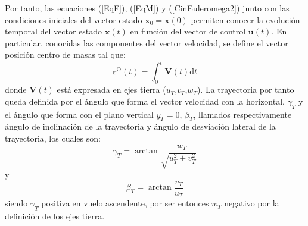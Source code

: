 Por tanto, las ecuaciones (\ref{EqF}), (\ref{EqM}) y (\ref{CinEuleromega2}) junto con las condiciones iniciales del vector estado $\mathrm{\textbf{x}_0}=\mathrm{\textbf{x}(0)}$ permiten conocer la evolución temporal del vector estado $\mathrm{\textbf{x}}(t)$ en función del vector de control $\mathrm{\textbf{u}}(t)$. En particular, conocidas las componentes del vector velocidad, se define el vector posición centro de masas tal que: 
\begin{equation}
	\mathrm{\textbf{r}^O}(t)=\int_{0}^{t}\mathrm{\textbf{V}}(t)\mathrm{d}t
\end{equation}
donde $\mathrm{\textbf{V}}(t)$ está expresada en ejes tierra ($u_T$,$v_T$,$w_T$). La trayectoria por tanto queda definida por el ángulo que forma el vector velocidad con la horizontal, $\gamma_T$ y el ángulo que forma con el plano vertical $y_T=0$, $\beta_T$, llamados respectivamente ángulo de inclinación de la trayectoria y ángulo de desviación lateral de la trayectoria, los cuales son:
\begin{equation}
	\gamma_T=\arctan\frac{-w_T}{\sqrt{u_T^2+v_T^2}}
	\label{gammat}
\end{equation}
y
\begin{equation}
\beta_T=\arctan\frac{v_T}{u_T}
\label{betat}
\end{equation}
siendo $\gamma_T$ positiva en vuelo ascendente, por ser entonces $w_T$ negativo por la definición de los ejes tierra.

